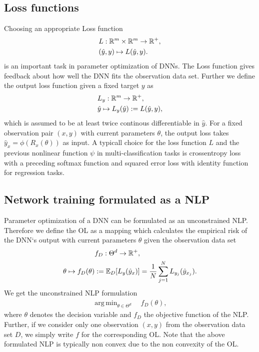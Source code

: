 \documentclass[conference]{IEEEtran}
\DeclareMathOperator*{\argmin}{arg\,min}
\begin{document}
	\subsection{Loss functions}
	\noindent
	Choosing an appropriate Loss function
	\begin{align}
	&L:\mathbb{R}^{m}\times \mathbb{R}^{m}\rightarrow \mathbb{R}^{+}, \notag\\
	&(\hat{y}, y)\mapsto L(\hat{y}, y).
	\end{align}
	is an important task in parameter optimization of DNNs. The Loss function gives feedback about how well the DNN fits the observation data set. Further we define the output loss function given a fixed target $y$ as
	\begin{align}
	&L_{y}:\mathbb{R}^{m}\rightarrow \mathbb{R}^{+}, \notag\\
	&\hat{y}\mapsto L_{y}(\hat{y}) := L(\hat{y}, y),
	\end{align}
	which is assumed to be at least twice continous differentiable in $\hat{y}$. For a fixed observation pair $(x, y)$ with current parameters $\theta$, the output loss takes $\hat{y}_{x} = \phi(R_{x}(\theta))$ as input. A typicall choice for the loss function $L$ and the previous nonlinear function $\psi$ in multi-classification tasks is crossentropy loss with a preceding softmax function and squared error loss with identity function for regression tasks.
	
	
	
	\subsection{Network training formulated as a NLP}
	\noindent
	Parameter optimization of a DNN can be formulated as an unconstrained NLP. Therefore we define the OL as a mapping which calculates the empirical risk of the DNN`s output with current parameters $\theta$ given the observation data set
	\begin{align}
	&f_{D}:\Theta^{d}\rightarrow\mathbb{R}^{+}, \notag\\
	\theta\mapsto f_{D}(\theta) &:= \mathbb{E}_{D}[L_{y}(\hat{y}_{x})] =  \frac{1}{N}\sum_{j = 1}^{N}L_{y_{j}}(\hat{y}_{x_{j}}).
	\end{align}
	We get the unconstrained NLP formulation
	\begin{align}
	\argmin_{\theta\in\Theta^{d}}\quad f_{D}(\theta),
	\end{align}
	where $\theta$ denotes the decision variable and $f_{D}$ the objective function of the NLP.
	Further, if we consider only one observation $(x, y)$ from the observation data set $D$, we simply write  $f$ for the corresponding OL. Note that the above formulated NLP is typically non convex due to the non convexity of the OL.
	
\end{document}
